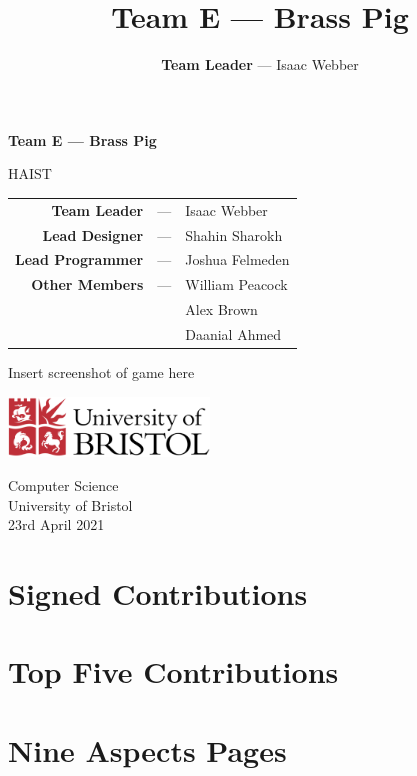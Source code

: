 \documentclass[11pt,a4paper,dvipsnames,cmyk,titlepage]{scrartcl}
\title{Team E --- Brass Pig}
\author{\textbf{Team Leader} --- Isaac Webber}
\begin{document}
\begin{titlepage}
    \begin{center}
        \vspace*{1cm}
        \huge
        \textbf{Team E --- Brass Pig}
            
        \vspace{0.5cm}
        \LARGE
        HAIST
            
        \vspace{1.5cm}
            
        \begin{tabular}{rcl}
        \textbf{Team Leader} & --- & Isaac Webber \\
        \textbf{Lead Designer} & --- & Shahin Sharokh \\
        \textbf{Lead Programmer} & --- & Joshua Felmeden \\
            \textbf{Other Members} & --- & William Peacock \\
            & & Alex Brown \\
            & & Daanial Ahmed
        \end{tabular}
            
        \vfill
            
        Insert screenshot of game here
            
        \vspace{0.8cm}
            
        \includegraphics[width=0.4\textwidth]{University_of_Bristol_logo.png}
            
        \Large
        Computer Science\\
        University of Bristol\\
        23rd April 2021
    \end{center}
\end{titlepage}
\newpage
\tableofcontents
\newpage
\section{Signed Contributions}
\section{Top Five Contributions}
\section{Nine Aspects Pages}
\end{document}
